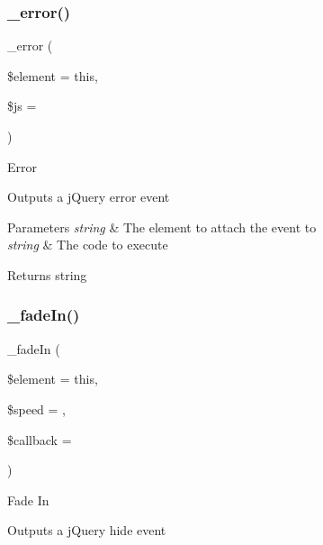 \subsubsection{\texorpdfstring{\+\_\+error()}{\_error()}}
{\footnotesize\ttfamily \+\_\+error (\begin{DoxyParamCaption}\item[{}]{\$element = {\ttfamily \textquotesingle{}this\textquotesingle{}},  }\item[{}]{\$js = {\ttfamily \textquotesingle{}\textquotesingle{}} }\end{DoxyParamCaption})\hspace{0.3cm}{\ttfamily [protected]}}

Error

Outputs a j\+Query error event


\begin{DoxyParams}{Parameters}
{\em string} & The element to attach the event to \\
\hline
{\em string} & The code to execute \\
\hline
\end{DoxyParams}
\begin{DoxyReturn}{Returns}
string 
\end{DoxyReturn}
\mbox{\label{class_c_i___jquery_a2d323b3e6a8e62d1a940cbf58e216992}} 
\subsubsection{\texorpdfstring{\+\_\+fade\+In()}{\_fadeIn()}}
{\footnotesize\ttfamily \+\_\+fade\+In (\begin{DoxyParamCaption}\item[{}]{\$element = {\ttfamily \textquotesingle{}this\textquotesingle{}},  }\item[{}]{\$speed = {\ttfamily \textquotesingle{}\textquotesingle{}},  }\item[{}]{\$callback = {\ttfamily \textquotesingle{}\textquotesingle{}} }\end{DoxyParamCaption})\hspace{0.3cm}{\ttfamily [protected]}}

Fade In

Outputs a j\+Query hide event


